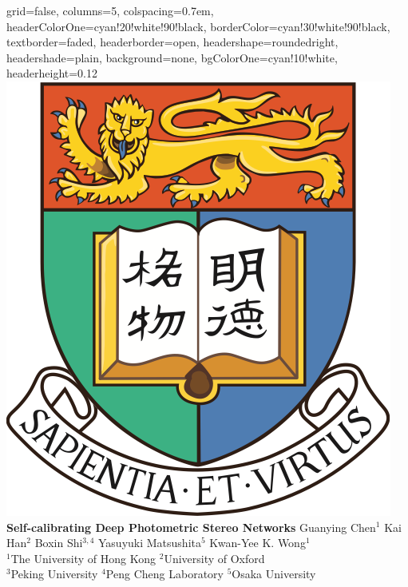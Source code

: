 \documentclass[landscape,a0paper,fontscale=0.292]{baposter}
\begin{document}
\begin{poster}{
    grid=false,
    columns=5,
    colspacing=0.7em,
    headerColorOne=cyan!20!white!90!black,
    borderColor=cyan!30!white!90!black,
    textborder=faded,
    headerborder=open,
    headershape=roundedright,
    headershade=plain,
    background=none,
    bgColorOne=cyan!10!white,
    headerheight=0.12\textheight
}
{
    \includegraphics[width=0.045\linewidth]{logo/HKU_logo}
    \makebox[0.005\textwidth]{} 
    \makebox[0.005\textwidth]{} 
    \makebox[0.005\textwidth]{} 
    \makebox[0.005\textwidth]{} 
}
{
    \sc\huge\bf Self-calibrating Deep Photometric Stereo Networks
}
{
    \vspace{0.3em} Guanying Chen$^1$ \enspace Kai Han$^2$ \enspace Boxin Shi$^{3,4}$ \enspace Yasuyuki Matsushita$^5$ \enspace Kwan-Yee K. Wong$^1$ \\[0.2em]
    {$^1$The University of Hong Kong \enspace$^2$University of Oxford \\[0.1em] $^3$Peking University \enspace$^4$Peng Cheng Laboratory \enspace$^5$Osaka University}
}
{
    \begin{tabular}{c}

\end{tabular}}
\end{poster}
\end{document}
